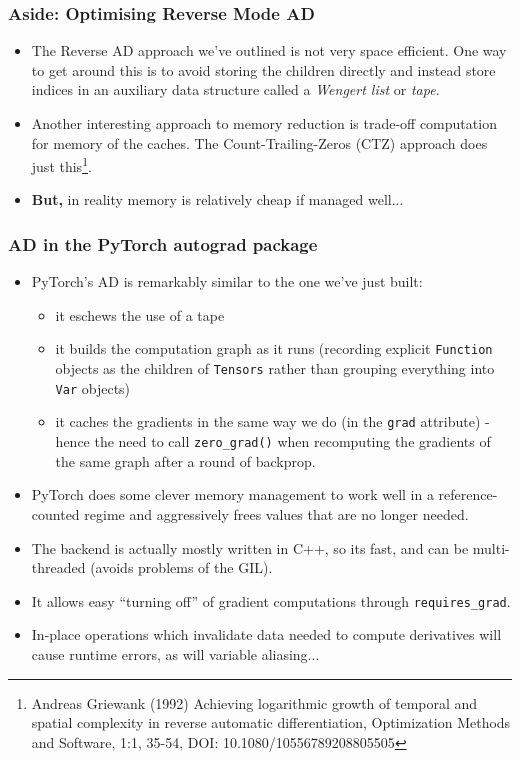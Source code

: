 \documentclass[\beamerclass]{beamer}
\begin{document}
\begin{frame}
\frametitle{Aside: Optimising Reverse Mode AD}
\begin{itemize}
	\item<+-> The Reverse AD approach we've outlined is not very space efficient. One way to get around this is to avoid storing the children directly and instead store indices in an auxiliary data structure called a \emph{Wengert list} or \emph{tape}.
	\item<+-> Another interesting approach to memory reduction is trade-off computation for memory of the caches. The Count-Trailing-Zeros (CTZ) approach does just this\footnote{Andreas Griewank (1992) Achieving logarithmic growth of temporal and spatial complexity in reverse automatic differentiation, Optimization Methods and Software, 1:1, 35-54, DOI: 10.1080/10556789208805505}.
	\item<+-> \textbf{But,} in reality memory is relatively cheap if managed well...
\end{itemize}
\end{frame}

\begin{frame}
\frametitle{AD in the PyTorch autograd package}

\begin{itemize}
	\item<+-> PyTorch's AD is remarkably similar to the one we've just built: \begin{itemize}
		\item<+-> it eschews the use of a tape
		\item<+-> it builds the computation graph as it runs (recording explicit \lstinline!Function! objects as the children of \lstinline!Tensors! rather than grouping everything into \lstinline!Var! objects)
		\item<+-> it caches the gradients in the same way we do (in the \lstinline!grad! attribute) - hence the need to call \lstinline!zero_grad()! when recomputing the gradients of the same graph after a round of backprop.
	\end{itemize}
	\item<+-> PyTorch does some clever memory management to work well in a reference-counted regime and aggressively frees values that are no longer needed.
	\item<+-> The backend is actually mostly written in C++, so its fast, and can be multi-threaded (avoids problems of the GIL).
	\item<+-> It allows easy ``turning off'' of gradient computations through \lstinline!requires_grad!.
	\item<+-> In-place operations which invalidate data needed to compute derivatives will cause runtime errors, as will variable aliasing...
\end{itemize}
\end{frame}


\end{document}
